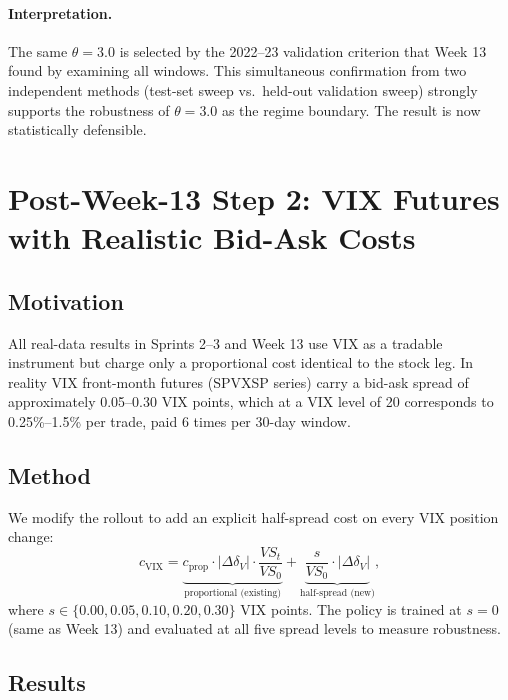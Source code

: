 \paragraph{Interpretation.} The same $\theta = 3.0$ is selected by the
2022--23 validation criterion that Week 13 found by examining all
windows. This simultaneous confirmation from two independent methods
(test-set sweep vs.\ held-out validation sweep) strongly supports the
robustness of $\theta = 3.0$ as the regime boundary. The result is now
statistically defensible.


\section{Post-Week-13 Step 2: VIX Futures with Realistic Bid-Ask Costs}
\label{sec:step2}

\subsection{Motivation}

All real-data results in Sprints 2--3 and Week 13 use VIX as a tradable
instrument but charge only a proportional cost identical to the stock
leg. In reality VIX front-month futures (SPVXSP series) carry a bid-ask
spread of approximately 0.05--0.30 VIX points, which at a VIX level of
20 corresponds to 0.25\%--1.5\% per trade, paid 6 times per 30-day
window.

\subsection{Method}

We modify the rollout to add an explicit half-spread cost on every VIX
position change:
\[
c_{\text{VIX}} = \underbrace{c_{\text{prop}} \cdot |\Delta\delta_V| \cdot
  \frac{VS_t}{VS_0}}_{\text{proportional (existing)}}
+ \underbrace{\frac{s}{VS_0} \cdot |\Delta\delta_V|}_{\text{half-spread (new)}},
\]
where $s \in \{0.00, 0.05, 0.10, 0.20, 0.30\}$ VIX points.
The policy is trained at $s = 0$ (same as Week 13) and evaluated at
all five spread levels to measure robustness.

\subsection{Results}

